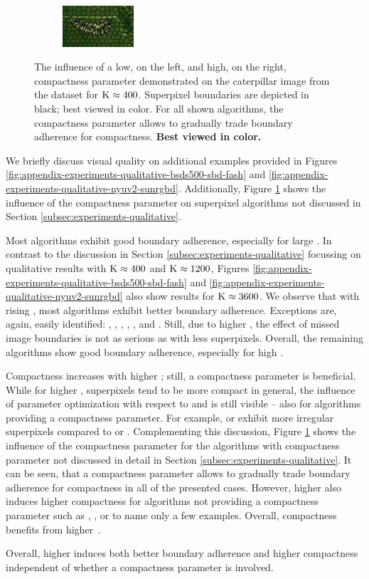 \begin{figure}
\begin{subfigure}[b]{0.141\textwidth}
	\end{subfigure}
	\begin{subfigure}[b]{0.141\textwidth}
		\includegraphics[height=1.525cm]{pictures/compactness/bsds500/etps/score/1/cropped/etps_35028_contours}
	\end{subfigure}
	\caption{The influence of a low, on the left, and high, on the right, compactness parameter
	demonstrated on the caterpillar image from the \BSDS dataset for $\text{K} \approx 400$.
	Superpixel boundaries are depicted in black; best viewed in color. For all shown algorithms,
	the compactness parameter allows to gradually trade boundary adherence for compactness.
	\textbf{Best viewed in color.}}
	\label{fig:appendix-experiments-qualitative-compactness}
\end{figure}

We briefly discuss visual quality on additional examples provided in Figures
\ref{fig:appendix-experiments-qualitative-bsds500-sbd-fash} and \ref{fig:appendix-experiments-qualitative-nyuv2-sunrgbd}.
Additionally, Figure \ref{fig:appendix-experiments-qualitative-compactness} shows
the influence of the compactness parameter on superpixel algorithms not discussed
in Section \ref{subsec:experiments-qualitative}.

Most algorithms exhibit good boundary adherence, especially for large \K.
In contrast to the discussion in Section \ref{subsec:experiments-qualitative} focussing
on qualitative results with $\text{K} \approx 400$ and $\text{K} \approx 1200$, Figures
\ref{fig:appendix-experiments-qualitative-bsds500-sbd-fash} and \ref{fig:appendix-experiments-qualitative-nyuv2-sunrgbd}
also show results for $\text{K} \approx 3600$. We observe that with rising \K,
most algorithms exhibit better boundary adherence. Exceptions are, again, easily
identified: \FH, \QS, \CIS, \PF, \PB, \TPS and \SEAW. Still, due to higher \K,
the effect of missed image boundaries is not as serious as with less superpixels.
Overall, the remaining algorithms show good boundary adherence, especially for high \K.

Compactness increases with higher \K; still, a compactness parameter is beneficial.
While for higher \K, superpixels tend to be more compact in general, the
influence of parameter optimization with respect to \Rec and \UE is still visible
-- also for algorithms providing a compactness parameter.
For example, \ERGC or \ETPS exhibit more irregular superpixels compared to \SLIC or \CCS.
Complementing this discussion, Figure \ref{fig:appendix-experiments-qualitative-compactness}
shows the influence of the compactness parameter for the algorithms with compactness
parameter not discussed in detail in Section \ref{subsec:experiments-qualitative}.
It can be seen, that a compactness parameter allows to gradually trade boundary
adherence for compactness in all of the presented cases.
However, higher \K also induces higher compactness for algorithms not providing a compactness parameter
such as \CIS, \RW, \W or \MSS to name only a few examples.
Overall, compactness benefits from higher~\K.

Overall, higher \K induces both better boundary adherence and higher compactness independent of whether a
compactness parameter is involved.
